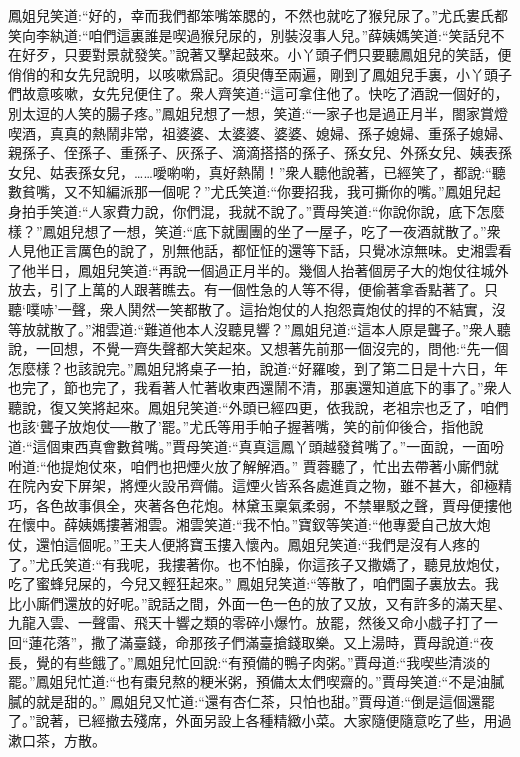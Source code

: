 \begin{parag}
    鳳姐兒笑道:“好的，幸而我們都笨嘴笨腮的，不然也就吃了猴兒尿了。”尤氏婁氏都笑向李紈道:“咱們這裏誰是喫過猴兒尿的，別裝沒事人兒。”薛姨媽笑道:“笑話兒不在好歹，只要對景就發笑。”說著又擊起鼓來。小丫頭子們只要聽鳳姐兒的笑話，便俏俏的和女先兒說明，以咳嗽爲記。須臾傳至兩遍，剛到了鳳姐兒手裏，小丫頭子們故意咳嗽，女先兒便住了。衆人齊笑道:“這可拿住他了。快吃了酒說一個好的，別太逗的人笑的腸子疼。”鳳姐兒想了一想，笑道:“一家子也是過正月半，閤家賞燈喫酒，真真的熱鬧非常，祖婆婆、太婆婆、婆婆、媳婦、孫子媳婦、重孫子媳婦、親孫子、侄孫子、重孫子、灰孫子、滴滴搭搭的孫子、孫女兒、外孫女兒、姨表孫女兒、姑表孫女兒，……噯喲喲，真好熱鬧！”衆人聽他說著，已經笑了，都說:“聽數貧嘴，又不知編派那一個呢？”尤氏笑道:“你要招我，我可撕你的嘴。”鳳姐兒起身拍手笑道:“人家費力說，你們混，我就不說了。”賈母笑道:“你說你說，底下怎麼樣？”鳳姐兒想了一想，笑道:“底下就團團的坐了一屋子，吃了一夜酒就散了。”衆人見他正言厲色的說了，別無他話，都怔怔的還等下話，只覺冰涼無味。史湘雲看了他半日，鳳姐兒笑道:“再說一個過正月半的。幾個人抬著個房子大的炮仗往城外放去，引了上萬的人跟著瞧去。有一個性急的人等不得，便偷著拿香點著了。只聽‘噗哧’一聲，衆人鬨然一笑都散了。這抬炮仗的人抱怨賣炮仗的捍的不結實，沒等放就散了。”湘雲道:“難道他本人沒聽見響？”鳳姐兒道:“這本人原是聾子。”衆人聽說，一回想，不覺一齊失聲都大笑起來。又想著先前那一個沒完的，問他:“先一個怎麼樣？也該說完。”鳳姐兒將桌子一拍，說道:“好羅唆，到了第二日是十六日，年也完了，節也完了，我看著人忙著收東西還鬧不清，那裏還知道底下的事了。”衆人聽說，復又笑將起來。鳳姐兒笑道:“外頭已經四更，依我說，老祖宗也乏了，咱們也該‘聾子放炮仗──散了’罷。”尤氏等用手帕子握著嘴，笑的前仰後合，指他說道:“這個東西真會數貧嘴。”賈母笑道:“真真這鳳丫頭越發貧嘴了。”一面說，一面吩咐道:“他提炮仗來，咱們也把煙火放了解解酒。” 賈蓉聽了，忙出去帶著小廝們就在院內安下屏架，將煙火設吊齊備。這煙火皆系各處進貢之物，雖不甚大，卻極精巧，各色故事俱全，夾著各色花炮。林黛玉稟氣柔弱，不禁畢駁之聲，賈母便摟他在懷中。薛姨媽摟著湘雲。湘雲笑道:“我不怕。”寶釵等笑道:“他專愛自己放大炮仗，還怕這個呢。”王夫人便將寶玉摟入懷內。鳳姐兒笑道:“我們是沒有人疼的了。”尤氏笑道:“有我呢，我摟著你。也不怕臊，你這孩子又撒嬌了，聽見放炮仗，吃了蜜蜂兒屎的，今兒又輕狂起來。” 鳳姐兒笑道:“等散了，咱們園子裏放去。我比小廝們還放的好呢。”說話之間，外面一色一色的放了又放，又有許多的滿天星、九龍入雲、一聲雷、飛天十響之類的零碎小爆竹。放罷，然後又命小戲子打了一回“蓮花落”，撒了滿臺錢，命那孩子們滿臺搶錢取樂。又上湯時，賈母說道:“夜長，覺的有些餓了。”鳳姐兒忙回說:“有預備的鴨子肉粥。”賈母道:“我喫些清淡的罷。”鳳姐兒忙道:“也有棗兒熬的粳米粥，預備太太們喫齋的。”賈母笑道:“不是油膩膩的就是甜的。” 鳳姐兒又忙道:“還有杏仁茶，只怕也甜。”賈母道:“倒是這個還罷了。”說著，已經撤去殘席，外面另設上各種精緻小菜。大家隨便隨意吃了些，用過漱口茶，方散。
\end{parag}


